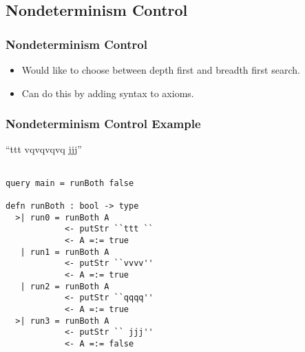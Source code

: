 \subsection[Nondeterminism]{Nondeterminism Control}
\begin{frame}
\frametitle{Nondeterminism Control}
\begin{itemize}
\item Would like to choose between depth first and breadth first search.
\item Can do this by adding syntax to axioms.
\end{itemize}
\end{frame}
\begin{frame}[fragile]
\frametitle{Nondeterminism Control Example}

“ttt vqvqvqvq jjj”

\begin{lstlisting}

query main = runBoth false

defn runBoth : bool -> type
  >| run0 = runBoth A
            <- putStr ``ttt ``
            <- A =:= true
   | run1 = runBoth A 
            <- putStr ``vvvv''
            <- A =:= true
   | run2 = runBoth A
            <- putStr ``qqqq''
            <- A =:= true
  >| run3 = runBoth A
            <- putStr `` jjj''
            <- A =:= false

\end{lstlisting}
\end{frame}
